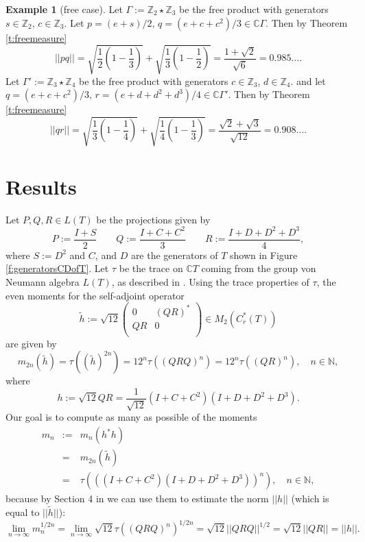 \documentclass{amsart}
\newcommand{\C}{\mathbb C}
\newcommand{\N}{\mathbb N}
\newcommand{\Z}{\mathbb Z}
\theoremstyle{definition}
\newtheorem{exam}[thm]{Example}     %
\begin{document}
\begin{exam}[free case]\label{ex:freeCase}
Let $\Gamma:=\Z_2\star \Z_3$ be the free product with generators
$s\in \Z_2$, $c\in \Z_3$. Let $p=(e+s)/2$, $q=(e+c+c^2)/3\in \C\Gamma$. Then by Theorem \ref{t:freemeasure}
$$||pq||=\sqrt{\frac12(1-\frac13)}+\sqrt{\frac13(1-\frac12)}=\frac{1+\sqrt2}{\sqrt6}=0.985\ldots.$$
Let $\Gamma':=\Z_3\star \Z_4$ be the free product with generators $c\in \Z_3$, $d\in\Z_4$.
and let $q=(e+c+c^2)/3$, $r=(e+d+d^2+d^3)/4\in \C\Gamma'$. Then by Theorem \ref{t:freemeasure}
$$||qr||=\sqrt{\frac13(1-\frac14)}+\sqrt{\frac14(1-\frac13)}=\frac{\sqrt2+\sqrt3}{\sqrt{12}}=0.908\ldots.$$
\end{exam}




 \section{\textbf{Results}}\label{s:results}
 Let $P,Q,R\in L(T)$ be the projections given by
\begin{equation*}
P:=\frac{I+S}{2}\qquad Q:=\frac{I+C+C^2}{3}\qquad R:=\frac{I+D+D^2+D^3}{4},
\end{equation*}
where $S:=D^2$ and $C$, and $D$ are the generators of $T$ shown in Figure \ref{f:generatorsCDofT}.
Let $\tau$ be the trace on $\C T$ coming from the group von Neumann algebra $L( T)$, as described in \cite[Section 2]{HaagerupRamirezSolano}.
 Using the trace properties of $\tau$, the even moments for the self-adjoint operator
 \begin{equation}\label{e:tildeh}
\tilde h:=\sqrt{12}\left(
  \begin{array}{cc}
    0 & (QR)^* \\
    QR & 0 \\
  \end{array}
\right)\in M_2(C_r^*(T))
\end{equation}
are given by
$$m_{2n}(\tilde h) =\tau((\tilde h)^{2n}) =12^{n} \tau((QRQ)^{n})=12^n\tau((QR)^n),\quad n\in\N,$$
where 
$$h:=\sqrt{12}QR=\frac1{\sqrt{12}}(I+C+C^2)(I+D+D^2+D^3).$$
Our goal is to compute as many as possible of the moments
\begin{eqnarray}\label{e:mn}
\nonumber m_n&:=&m_n(h^*h)\\
\nonumber&=&m_{2n}(\tilde h)\\
&=&\tau(((I+C+C^2)(I+D+D^2+D^3))^n),\quad n\in\N,
\end{eqnarray}
because by Section 4 in \cite{HaagerupRamirezSolano}  we can use them to estimate the norm $|| h||$ (which is equal to $|| \tilde h||$):
$$\lim_{n\to\infty}m_n^{1/2n}=\lim_{n\to\infty}\sqrt{12}\tau((QRQ)^n)^{1/2n}= \sqrt{12}||QRQ||^{1/2}=\sqrt{12}||QR||=|| h||.$$
\end{document}
